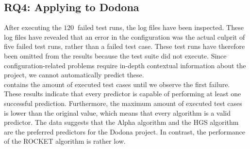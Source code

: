 \subsection{RQ4: Applying \tcp{} to Dodona}
After executing the $\SI{120}{}$ failed test runs, the log files have been inspected. These log files have revealed that an error in the configuration was the actual culprit of five failed test runs, rather than a failed test case. These test runs have therefore been omitted from the results because the test suite did not execute. Since configuration-related problems require in-depth contextual information about the project, we cannot automatically predict these.\\

\noindent {} contains the amount of executed test cases until we observe the first failure. These results indicate that every predictor is capable of performing at least one successful prediction. Furthermore, the maximum amount of executed test cases is lower than the original value, which means that every algorithm is a valid predictor. The data suggests that the Alpha algorithm and the HGS algorithm are the preferred predictors for the Dodona project. In contrast, the performance of the ROCKET algorithm is rather low.\\

